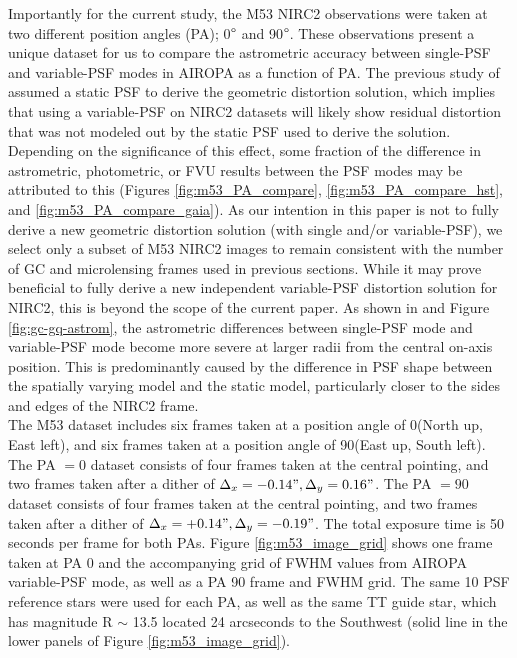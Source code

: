 \documentclass[]{spie}  %
\begin{document}
\indent Importantly for the current study, the M53 NIRC2 observations were taken at two different position angles (PA); 0$\degree$ and 90$\degree$. These observations present a unique dataset for us to compare the astrometric accuracy between single-PSF and variable-PSF modes in AIROPA as a function of PA. The previous study of \cite{service:2016a} assumed a static PSF to derive the geometric distortion solution, which implies that using a variable-PSF on NIRC2 datasets will likely show residual distortion that was not modeled out by the static PSF used to derive the solution. Depending on the significance of this effect, some fraction of the difference in astrometric, photometric, or FVU results between the PSF modes may be attributed to this (Figures \ref{fig:m53_PA_compare}, \ref{fig:m53_PA_compare_hst}, and \ref{fig:m53_PA_compare_gaia}). As our intention in this paper is not to fully derive a new geometric distortion solution (with single and/or variable-PSF), we select only a subset of M53 NIRC2 images to remain consistent with the number of GC and microlensing frames used in previous sections. While it may prove beneficial to fully derive a new independent variable-PSF distortion solution for NIRC2, this is beyond the scope of the current paper. As shown in \cite{Turri:inprep} and Figure \ref{fig:gc-gq-astrom}, the astrometric differences between single-PSF mode and variable-PSF mode become more severe at larger radii from the central on-axis position. This is predominantly caused by the difference in PSF shape between the spatially varying model and the static model, particularly closer to the sides and edges of the NIRC2 frame.
\\
\indent The M53 dataset includes six frames taken at a position angle of 0\degree (North up, East left), and six frames taken at a position angle of 90\degree (East up, South left). The PA $=0$ dataset consists of four frames taken at the central pointing, and two frames taken after a dither of $\Delta_x = -0.14", \Delta_y = 0.16"$. The PA $=90$ dataset consists of four frames taken at the central pointing, and two frames taken after a dither of $\Delta_x = +0.14", \Delta_y = -0.19"$. The total exposure time is 50 seconds per frame for both PAs. Figure \ref{fig:m53_image_grid} shows one frame taken at PA 0 and the accompanying grid of FWHM values from AIROPA variable-PSF mode, as well as a PA 90 frame and FWHM grid. The same 10 PSF reference stars were used for each PA, as well as the same TT guide star, which has magnitude R ${\sim}$ 13.5 located 24 arcseconds to the Southwest (solid line in the lower panels of Figure \ref{fig:m53_image_grid}).
\end{document}
